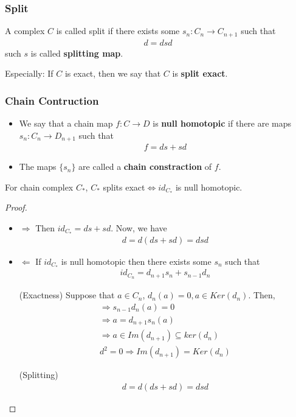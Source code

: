 \documentclass[Total.tex]{subfiles}
\begin{document}
				\subsubsection{Split}
				\begin{Def}
					A complex $C$ is called split if there exists some $s_n:C_{n}\rightarrow C_{n+1}$ such that
					\begin{gather*}
						d=dsd
					\end{gather*}
					such $s$ is called \textbf{splitting map}.
					
					Especially: If $C$ is exact, then we say that $C$ is \textbf{split exact}.
				\end{Def}
				\subsubsection{Chain Contruction}
					\begin{Def}
						\begin{itemize}
							\item We say that a chain map $f:C\rightarrow D$ is \textbf{null homotopic} if there are maps $s_n:C_n\rightarrow D_{n+1}$ such that
							\begin{gather*}
								f=ds+sd
							\end{gather*}
							\item The maps $\{s_n\}$ are called a \textbf{chain constraction} of $f$.
						\end{itemize}
					\end{Def}
					\begin{proposition}
						For chain complex $C_*$, $C_*$ splits exact$\Leftrightarrow id_{C_*}$ is null homotopic.
					\end{proposition}
					\begin{proof}
						\begin{itemize}
							\item $\Rightarrow$ Then $id_{C_*}=ds+sd$.  Now, we have
							\begin{gather*}
								d=d(ds+sd)=dsd
							\end{gather*}
							\item $\Leftarrow$ If $id_{C_*}$ is null homotopic then there exists some $s_n$ such that
							\begin{gather*}
								id_{C_n}=d_{n+1}s_n+s_{n-1}d_n
							\end{gather*}
							
							(Exactness) Suppose that $a\in C_n$, $d_n(a)=0,a\in Ker(d_n)$. Then,
							\begin{gather*}
								\Rightarrow s_{n-1}d_n(a)=0
								\\ \Rightarrow a=d_{n+1}s_n(a)\\
								\Rightarrow a\in Im(d_{n+1})\subseteq ker(d_n) \\
								d^2=0\Rightarrow Im(d_{n+1})=Ker(d_n)
							\end{gather*}
							
							(Splitting) 
							\begin{gather*}
								d=d(ds+sd)=dsd
							\end{gather*}
						\end{itemize}
					\end{proof}
\end{document}
